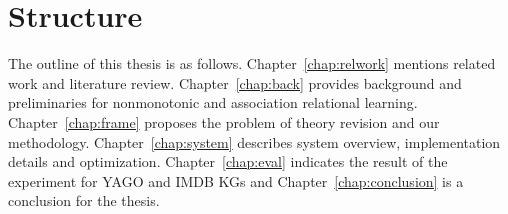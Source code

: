 \section{Structure}

The outline of this thesis is as follows. Chapter~\ref{chap:relwork} mentions related work and literature review. Chapter~\ref{chap:back} provides background and preliminaries for nonmonotonic and association relational learning. Chapter~\ref{chap:frame} proposes the problem of theory revision and our methodology. Chapter~\ref{chap:system} describes system overview, implementation details and optimization. Chapter~\ref{chap:eval} indicates the result of the experiment for YAGO and IMDB KGs and Chapter~\ref{chap:conclusion} is a conclusion for the thesis.